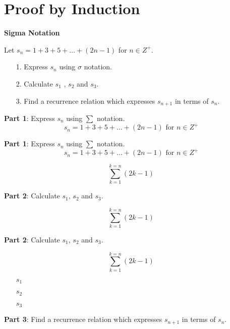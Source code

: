 \documentclass[12pt]{article}
\begin{document}
\section{Proof by Induction}


	\noindent \textbf{Sigma Notation}
	

	Let $s_n = 1 + 3 + 5 + \ldots + (2n-1)$ for $n \in Z^{+}$.\\
	\bigskip
	\begin{itemize}
		\item[1.] Express $s_n$ using $\sigma$ notation. \\
		\bigskip
		\item[2.] Calculate $s_1$ , $s_2$ and $s_3$. \\
		\bigskip
		\item[3.] Find a recurrence relation which expresses $s_{n+1}$ in terms of $s_n$.
	\end{itemize}

	
	
	\textbf{Part 1}: Express $s_n$ using $\sum$ notation.
	\[s_n = 1 + 3 + 5 + \ldots + (2n-1) \mbox{   for }n \in Z^{+}\]
	

	\textbf{Part 1}: Express $s_n$ using $\sum$ notation.
	\[s_n = 1 + 3 + 5 + \ldots + (2n-1) \mbox{   for }n \in Z^{+}\]
	
	{
		
		\[  \sum^{k=n}_{k=1} (2k-1) \]
	}


	
	
	\textbf{Part 2}: Calculate $s_1$, $s_2$ and $s_3$.
	
	{
		
		\[  \sum^{k=n}_{k=1} (2k-1) \]
	}
	
	
	


	
	
	\textbf{Part 2}: Calculate $s_1$, $s_2$ and $s_3$.
	
	{
		
		\[  \sum^{k=n}_{k=1} (2k-1) \]
	}
	
	\begin{itemize}
		\item[$s_1$]
		\item[$s_2$]
		\item[$s_3$]
	\end{itemize}
	


	
	
	\textbf{Part 3}: Find a recurrence relation which expresses $s_{n+1}$ in terms of $s_n$.
	
	
\end{document}
